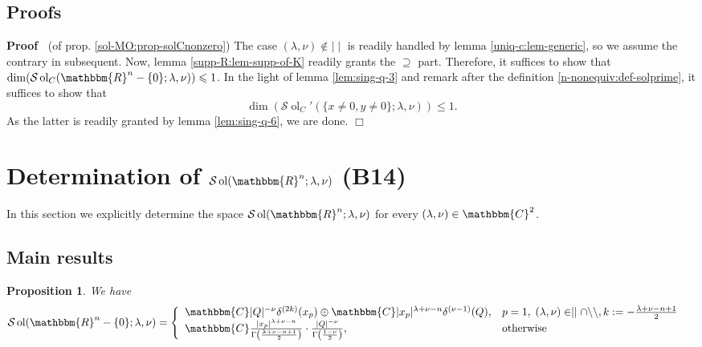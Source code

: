 \documentclass[12pt]{article}
\newcommand{\nin}{\not\in}
\newcommand{\tmop}[1]{\ensuremath{\operatorname{#1}}}
\renewenvironment{proof}{\noindent\textbf{Proof\ }}{\hspace*{\fill}$\Box$\medskip}
\newtheorem{proposition}{Proposition}[section]
\theoremstyle{remark}
\begin{document}
\subsection{Proofs}

\begin{proof}
  (of prop. \ref{sol-MO:prop-solCnonzero}) The case $(\lambda, \nu) \nin \mid
  \mid$ is readily handled by lemma \ref{uniq-c:lem-generic}, so we assume the
  contrary in subsequent. Now, lemma \ref{supp-R:lem-supp-of-K} readily grants
  the $\supseteq$ part. Therefore, it suffices to show that $\dim (\mathcal{S}
  \tmop{ol}_C (\mathbbm{R}^n - \{ 0 \} ; \lambda, \nu)) \leqslant 1$. In the
  light of lemma \ref{lem:sing-q-3} and remark after the definition
  \ref{n-nonequiv:def-solprime}, it suffices to show that
  \[ \dim (\mathcal{S} \tmop{ol}_C' (\{ x \neq 0, y \neq 0 \} ; \lambda,
     \nu)) \leqslant 1. \]
  As the latter is readily granted by lemma \ref{lem:sing-q-6}, we are done.
\end{proof}

\section{Determination of $\mathcal{S} \tmop{ol} (\mathbbm{R}^n ; \lambda,\nu)$ (B14)}\label{sec:sol-MO}


In this section we explicitly determine the space $\mathcal{S} \tmop{ol}
(\mathbbm{R}^n ; \lambda, \nu)$ for every $(\lambda, \nu) \in \mathbbm{C}^2$.

\subsection{Main results}

\begin{proposition}
  \label{sol-MO:prop-solonnonzero}We have
  \begin{eqnarray}
    & \mathcal{S} \tmop{ol} (\mathbbm{R}^n - \{ 0 \} ; \lambda, \nu) =
    \left\{ \begin{array}{ll}
      \mathbbm{C} | Q |^{- \nu} \delta^{(2 k)} (x_p) \oplus \mathbbm{C} | x_p
      |^{\lambda + \nu - n} \delta^{(\nu - 1)} (Q), & p = 1, \; (\lambda, \nu)
      \in \mid \mid \cap \backslash\backslash, k : = - \frac{\lambda + \nu - n
      + 1}{2}\\
      \mathbbm{C} \frac{| x_p |^{\lambda + \nu - n}}{\Gamma \left(
      \frac{\lambda + \nu - n + 1}{2} \right)} \cdot \frac{| Q |^{-
      \nu}}{\Gamma \left( \frac{1 - \nu}{2} \right)}, & \tmop{otherwise}
    \end{array} \right. &  \nonumber
  \end{eqnarray}
\end{proposition}
\end{document}
